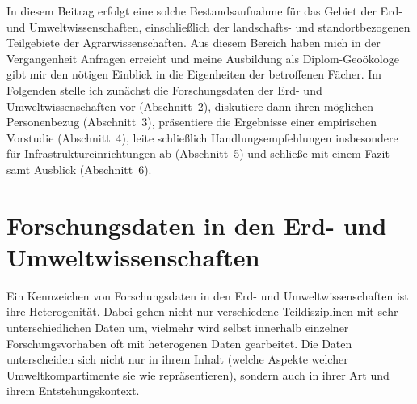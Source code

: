 \documentclass[a4paper,
fontsize=11pt,
oneside,
numbers=noperiodatend,
parskip=half-,
bibliography=totoc,
final
]{scrartcl}
\begin{document}
In diesem Beitrag erfolgt eine solche Bestandsaufnahme für das Gebiet
der Erd- und Umweltwissenschaften, einschließlich der landschafts- und
standortbezogenen Teilgebiete der Agrarwissenschaften. Aus diesem
Bereich haben mich in der Vergangenheit Anfragen erreicht und meine
Ausbildung als Diplom-Geoökologe gibt mir den nötigen Einblick in die
Eigenheiten der betroffenen Fächer. Im Folgenden stelle ich zunächst die
Forschungsdaten der Erd- und Umweltwissenschaften vor (Abschnitt~2),
diskutiere dann ihren möglichen Personenbezug (Abschnitt~3), präsentiere
die Ergebnisse einer empirischen Vorstudie (Abschnitt~4), leite
schließlich Handlungsempfehlungen insbesondere für
Infrastruktureinrichtungen ab (Abschnitt~5) und schließe mit einem Fazit
samt Ausblick (Abschnitt~6).

\hypertarget{forschungsdaten-in-den-erd--und-umweltwissenschaften}{%
\section{Forschungsdaten in den Erd- und Umweltwissenschaften}\label{forschungsdaten-in-den-erd--und-umweltwissenschaften}}

Ein Kennzeichen von Forschungsdaten in den Erd- und Umweltwissenschaften
ist ihre Heterogenität. Dabei gehen nicht nur verschiedene
Teildisziplinen mit sehr unterschiedlichen Daten um, vielmehr wird
selbst innerhalb einzelner Forschungsvorhaben oft mit heterogenen Daten
gearbeitet. Die Daten unterscheiden sich nicht nur in ihrem Inhalt
(welche Aspekte welcher Umweltkompartimente sie wie repräsentieren),
sondern auch in ihrer Art und ihrem Entstehungskontext.
\end{document}
